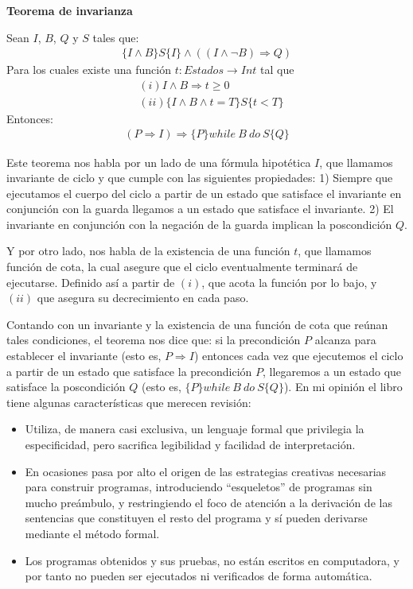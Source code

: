\documentclass[12pt, a4paper, openany, fleqn]{book}
\begin{document}
    \noindent\textbf{Teorema de invarianza}

    \noindent Sean $I$, $B$, $Q$ y $S$ tales que:
    \begin{align*}
        \{I \land B\} S \{I\} \land ((I \land \lnot B) \Rightarrow Q)
    \end{align*}
    Para los cuales existe una función $t: Estados \to Int$ tal que
    \begin{align*}
        & (i) I \land B \Rightarrow t \geqslant 0 \\
        & (ii) \{I \land B \land t=T\} S \{t < T\}
    \end{align*}
    Entonces:
    \begin{align*}
        (P \Rightarrow I) \Rightarrow \{P\}while\ B\ do\ S\{Q\}
    \end{align*}

    Este teorema nos habla por un lado de una fórmula hipotética $I$, que llamamos invariante de ciclo y que cumple con las siguientes propiedades: 1) Siempre que ejecutamos el cuerpo del ciclo a partir de un estado que satisface el invariante en conjunción con la guarda llegamos a un estado que satisface el invariante. 2) El invariante en conjunción con la negación de la guarda implican la poscondición $Q$.

    Y por otro lado, nos habla de la existencia de una función $t$, que llamamos función de cota, la cual asegure que el ciclo eventualmente terminará de ejecutarse. Definido así a partir de $(i)$, que acota la función por lo bajo, y $(ii)$ que asegura su decrecimiento en cada paso.

    Contando con un invariante y la existencia de una función de cota que reúnan tales condiciones, el teorema nos dice que: si la precondición $P$ alcanza para establecer el invariante (esto es, $P \Rightarrow I$) entonces cada vez que ejecutemos el ciclo a partir de un estado que satisface la precondición $P$, llegaremos a un estado que satisface la poscondición $Q$ (esto es, $\{P\}while\ B\ do\ S\{Q\}$).
    En mi opinión el libro tiene algunas características que merecen revisión:
    \begin{itemize}
    \item Utiliza, de manera casi exclusiva, un lenguaje formal que privilegia la especificidad, pero sacrifica legibilidad y facilidad de interpretación.
    \item En ocasiones pasa por alto el origen de las estrategias creativas necesarias para construir programas, introduciendo ``esqueletos'' de programas sin mucho preámbulo, y restringiendo el foco de atención a la derivación de las sentencias que constituyen el resto del programa y sí pueden derivarse mediante el método formal.
    \item Los programas obtenidos y sus pruebas, no están escritos en computadora, y por tanto no pueden ser ejecutados ni verificados de forma automática.
    \end{itemize}
\end{document}

